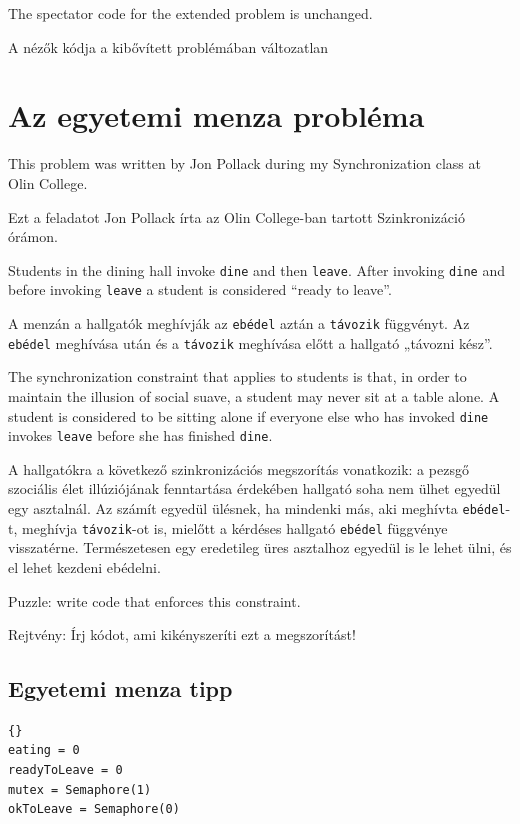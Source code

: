 \documentclass{book}
\newcommand{\clearemptydoublepage}{\newpage\cleardoublepage}
\begin{document}
The spectator code for the extended problem is unchanged.

A nézők kódja a kibővített problémában változatlan


\clearemptydoublepage
\section{Az egyetemi menza probléma}

This problem was written by Jon Pollack during my Synchronization
class at Olin College.  

Ezt a feladatot Jon Pollack írta az Olin College-ban tartott
Szinkronizáció órámon.

Students in the dining hall invoke {\tt dine} and then {\tt leave}.
After invoking {\tt dine} and before invoking {\tt leave} a student is
considered ``ready to leave''.

A menzán a hallgatók meghívják az {\tt ebédel} aztán a {\tt távozik}
függvényt. Az {\tt ebédel} meghívása után és a {\tt távozik}
meghívása előtt a hallgató „távozni kész”.

The synchronization constraint that applies to students is that, in
order to maintain the illusion of social suave, a student may never
sit at a table alone.  A student is considered to be sitting alone
if everyone else who has invoked {\tt dine} invokes {\tt leave}
before she has finished {\tt dine}.

A hallgatókra a következő szinkronizációs megszorítás vonatkozik:
a pezsgő szociális élet illúziójának fenntartása érdekében hallgató
soha nem ülhet egyedül egy asztalnál. Az számít egyedül ülésnek,
ha mindenki más, aki meghívta {\tt ebédel}-t, meghívja {\tt távozik}-ot
is, mielőtt a kérdéses hallgató {\tt ebédel} függvénye visszatérne.
Természetesen egy eredetileg üres asztalhoz egyedül is le lehet
ülni, és el lehet kezdeni ebédelni.


Puzzle: write code that enforces this constraint.

Rejtvény: Írj kódot, ami kikényszeríti ezt a megszorítást!


\clearemptydoublepage
\subsection{Egyetemi menza tipp}

\begin{lstlisting}[title={Dining Hall problem hint}]{}
eating = 0
readyToLeave = 0
mutex = Semaphore(1)
okToLeave = Semaphore(0)
\end{lstlisting}
\end{document}
